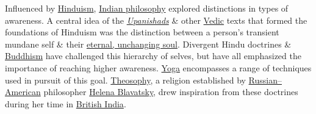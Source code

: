 \documentclass[oneside]{book}
\numberwithin{equation}{section}
\begin{document}
Influenced by \href{https://en.wikipedia.org/wiki/Hinduism}{Hinduism}, \href{https://en.wikipedia.org/wiki/Indian_philosophy}{Indian philosophy} explored distinctions in types of awareness. A central idea of the \href{https://en.wikipedia.org/wiki/Upanishads}{\textit{Upanishads}} \& other \href{https://en.wikipedia.org/wiki/Vedic_period}{Vedic} texts that formed the foundations of Hinduism was the distinction between a person's transient mundane self \& their \href{https://en.wikipedia.org/wiki/%C4%80tman_(Hinduism)}{eternal, unchanging soul}. Divergent Hindu doctrines \& \href{https://en.wikipedia.org/wiki/Buddhism}{Buddhism} have challenged this hierarchy of selves, but have all emphasized the importance of reaching higher awareness. \href{https://en.wikipedia.org/wiki/Yoga}{Yoga} encompasses a range of techniques used in pursuit of this goal. \href{https://en.wikipedia.org/wiki/Theosophy}{Theosophy}, a religion established by \href{https://en.wikipedia.org/wiki/Russian_Americans}{Russian--American} philosopher \href{https://en.wikipedia.org/wiki/Helena_Blavatsky}{Helena Blavatsky}, drew inspiration from these doctrines during her time in \href{https://en.wikipedia.org/wiki/British_Raj}{British India}.
\end{document}
